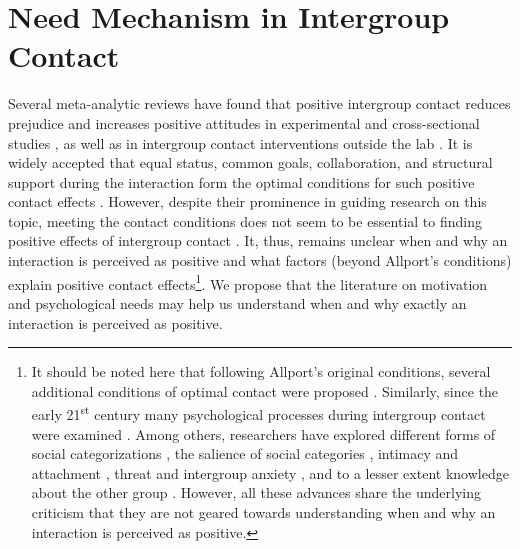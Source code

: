 \documentclass[man, 12pt, a4paper, mask]{apa7}
\theoremstyle{break}
\theoremstyle{plain}
\begin{document}
\section{Need Mechanism in Intergroup Contact}
Several meta-analytic reviews have found that positive intergroup contact reduces prejudice and increases positive attitudes in experimental and cross-sectional studies \citep[][]{Tropp2005, Pettigrew2006, Davies2011}, as well as in intergroup contact interventions outside the lab \citep[][]{Beelmann2014, Lemmer2015}. It is widely accepted that equal status, common goals, collaboration, and structural support during the interaction form the optimal conditions for such positive contact effects \citep[][]{Allport1954b, Pettigrew1969}. However, despite their prominence in guiding research on this topic, meeting the contact conditions does not seem to be essential to finding positive effects of intergroup contact \citep[][]{Pettigrew2006}. It, thus, remains unclear when and why an interaction is perceived as positive and what factors (beyond Allport's conditions) explain positive contact effects\footnote{It should be noted here that following Allport's original conditions, several additional conditions of optimal contact were proposed \citep[for a critical discussion see][]{Pettigrew1986}. Similarly, since the early 21\textsuperscript{st} century many psychological processes during intergroup contact were examined \citep[e.g. see,][]{Paolini2021}. Among others, researchers have explored different forms of social categorizations \citep[][]{Pettigrew1998}, the salience of social categories \citep[][]{Brown2005}, intimacy \citep[e.g.,][]{Marinucci2021} and attachment \citep[e.g.,][]{Tropp2021}, threat and intergroup anxiety \citep[e.g.,][]{Stephan2008, Paolini2004}, and to a lesser extent knowledge about the other group \citep[][]{Pettigrew2008c}. However, all these advances share the underlying criticism that they are not geared towards understanding when and why an interaction is perceived as positive.}. We propose that the literature on motivation and psychological needs may help us understand when and why exactly an interaction is perceived as positive.
\end{document}
